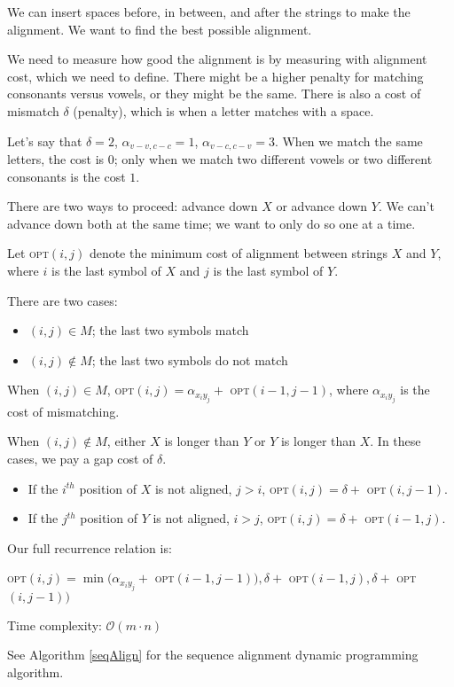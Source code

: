 \documentclass{article}
\newcommand{\Oh}{\mathcal{O}}
\newcommand{\OPT}{\textsc{opt}}
\begin{document}
We can insert spaces before, in between, and after the strings to make the alignment. We want to find the best possible alignment.

We need to measure how good the alignment is by measuring with alignment cost, which we need to define. There might be a higher penalty for matching consonants versus vowels, or they might be the same. There is also a cost of mismatch $\delta$ (penalty), which is when a letter matches with a space.

Let's say that $\delta = 2$, $\alpha_{v-v,c-c} = 1$, $\alpha_{v-c,c-v} = 3$. When we match the same letters, the cost is $0$; only when we match two different vowels or two different consonants is the cost $1$.

There are two ways to proceed: advance down $X$ or advance down $Y$. We can't advance down both at the same time; we want to only do so one at a time.

Let \OPT$(i, j)$ denote the minimum cost of alignment between strings $X$ and $Y$, where $i$ is the last symbol of $X$ and $j$ is the last symbol of $Y$.

There are two cases:
\begin{itemize}
    \item $(i, j) \in M$; the last two symbols match
    \item $(i, j) \notin M$; the last two symbols do not match
\end{itemize}

When $(i, j) \in M$, \OPT$(i, j) = \alpha_{x_iy_j} +$ \OPT$(i-1, j-1)$, where $\alpha_{x_iy_j}$ is the cost of mismatching.

When $(i, j) \notin M$, either $X$ is longer than $Y$ or $Y$ is longer than $X$. In these cases, we pay a gap cost of $\delta$.

\begin{itemize}
    \item If the $i^{th}$ position of $X$ is not aligned, $j > i$, \OPT$(i, j) = \delta +$ \OPT$(i, j-1)$.
    \item If the $j^{th}$ position of $Y$ is not aligned, $i > j$, \OPT$(i, j) = \delta +$ \OPT$(i-1, j)$.
\end{itemize}

Our full recurrence relation is:

\OPT$(i, j) = \min(\alpha_{x_iy_j} +$ \OPT$(i-1, j-1)), \delta +$ \OPT$(i-1, j), \delta +$ \OPT$(i, j-1))$

Time complexity: $\Oh(m \cdot n)$

See Algorithm \ref{seqAlign} for the sequence alignment dynamic programming algorithm.
\end{document}
